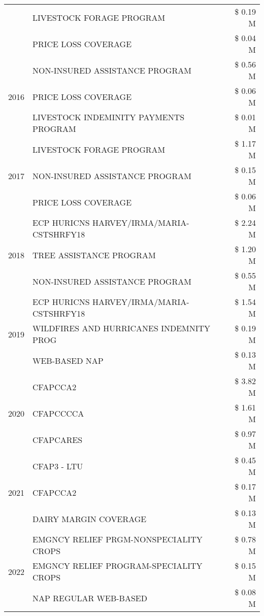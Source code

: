 \begin{tabular}{llr}
 & LIVESTOCK FORAGE PROGRAM & \$ 0.19 M \\
 & PRICE LOSS COVERAGE & \$ 0.04 M \\
\cline{1-3}
\multirow[t]{3}{*}{2016} & NON-INSURED ASSISTANCE PROGRAM & \$ 0.56 M \\
 & PRICE LOSS COVERAGE & \$ 0.06 M \\
 & LIVESTOCK INDEMINITY PAYMENTS PROGRAM & \$ 0.01 M \\
\cline{1-3}
\multirow[t]{3}{*}{2017} & LIVESTOCK FORAGE PROGRAM & \$ 1.17 M \\
 & NON-INSURED ASSISTANCE PROGRAM & \$ 0.15 M \\
 & PRICE LOSS COVERAGE & \$ 0.06 M \\
\cline{1-3}
\multirow[t]{3}{*}{2018} & ECP HURICNS HARVEY/IRMA/MARIA-CSTSHRFY18 & \$ 2.24 M \\
 & TREE ASSISTANCE PROGRAM & \$ 1.20 M \\
 & NON-INSURED ASSISTANCE PROGRAM & \$ 0.55 M \\
\cline{1-3}
\multirow[t]{3}{*}{2019} & ECP HURICNS HARVEY/IRMA/MARIA-CSTSHRFY18 & \$ 1.54 M \\
 & WILDFIRES AND HURRICANES INDEMNITY PROG & \$ 0.19 M \\
 & WEB-BASED NAP & \$ 0.13 M \\
\cline{1-3}
\multirow[t]{3}{*}{2020} & CFAPCCA2 & \$ 3.82 M \\
 & CFAPCCCCA & \$ 1.61 M \\
 & CFAPCARES & \$ 0.97 M \\
\cline{1-3}
\multirow[t]{3}{*}{2021} & CFAP3 - LTU & \$ 0.45 M \\
 & CFAPCCA2 & \$ 0.17 M \\
 & DAIRY MARGIN COVERAGE & \$ 0.13 M \\
\cline{1-3}
\multirow[t]{3}{*}{2022} & EMGNCY RELIEF PRGM-NONSPECIALITY CROPS & \$ 0.78 M \\
 & EMGNCY RELIEF PROGRAM-SPECIALITY CROPS & \$ 0.15 M \\
 & NAP REGULAR WEB-BASED & \$ 0.08 M \\
\cline{1-3}
\bottomrule
\end{tabular}
